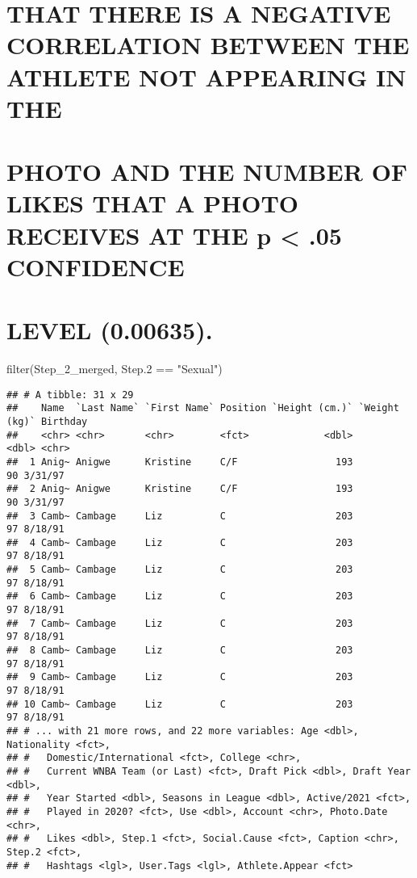 \documentclass[
]{article}
\newenvironment{Shaded}{\begin{snugshade}}{\end{snugshade}}
\newcommand{\FloatTok}[1]{\textcolor[rgb]{0.00,0.00,0.81}{#1}}
\newcommand{\FunctionTok}[1]{\textcolor[rgb]{0.00,0.00,0.00}{#1}}
\newcommand{\NormalTok}[1]{#1}
\newcommand{\SpecialCharTok}[1]{\textcolor[rgb]{0.00,0.00,0.00}{#1}}
\newcommand{\StringTok}[1]{\textcolor[rgb]{0.31,0.60,0.02}{#1}}
\begin{document}
\hypertarget{that-there-is-a-negative-correlation-between-the-athlete-not-appearing-in-the}{%
\section{THAT THERE IS A NEGATIVE CORRELATION BETWEEN THE ATHLETE NOT
APPEARING IN
THE}\label{that-there-is-a-negative-correlation-between-the-athlete-not-appearing-in-the}}

\hypertarget{photo-and-the-number-of-likes-that-a-photo-receives-at-the-p-.05-confidence}{%
\section{PHOTO AND THE NUMBER OF LIKES THAT A PHOTO RECEIVES AT THE p
\textless{} .05
CONFIDENCE}\label{photo-and-the-number-of-likes-that-a-photo-receives-at-the-p-.05-confidence}}

\hypertarget{level-0.00635.}{%
\section{LEVEL (0.00635).}\label{level-0.00635.}}

\begin{Shaded}
\begin{Highlighting}[]
\FunctionTok{filter}\NormalTok{(Step\_2\_merged, Step}\FloatTok{.2} \SpecialCharTok{==} \StringTok{"Sexual"}\NormalTok{)}
\end{Highlighting}
\end{Shaded}

\begin{verbatim}
## # A tibble: 31 x 29
##    Name  `Last Name` `First Name` Position `Height (cm.)` `Weight (kg)` Birthday
##    <chr> <chr>       <chr>        <fct>             <dbl>         <dbl> <chr>   
##  1 Anig~ Anigwe      Kristine     C/F                 193            90 3/31/97 
##  2 Anig~ Anigwe      Kristine     C/F                 193            90 3/31/97 
##  3 Camb~ Cambage     Liz          C                   203            97 8/18/91 
##  4 Camb~ Cambage     Liz          C                   203            97 8/18/91 
##  5 Camb~ Cambage     Liz          C                   203            97 8/18/91 
##  6 Camb~ Cambage     Liz          C                   203            97 8/18/91 
##  7 Camb~ Cambage     Liz          C                   203            97 8/18/91 
##  8 Camb~ Cambage     Liz          C                   203            97 8/18/91 
##  9 Camb~ Cambage     Liz          C                   203            97 8/18/91 
## 10 Camb~ Cambage     Liz          C                   203            97 8/18/91 
## # ... with 21 more rows, and 22 more variables: Age <dbl>, Nationality <fct>,
## #   Domestic/International <fct>, College <chr>,
## #   Current WNBA Team (or Last) <fct>, Draft Pick <dbl>, Draft Year <dbl>,
## #   Year Started <dbl>, Seasons in League <dbl>, Active/2021 <fct>,
## #   Played in 2020? <fct>, Use <dbl>, Account <chr>, Photo.Date <chr>,
## #   Likes <dbl>, Step.1 <fct>, Social.Cause <fct>, Caption <chr>, Step.2 <fct>,
## #   Hashtags <lgl>, User.Tags <lgl>, Athlete.Appear <fct>
\end{verbatim}
\end{document}
